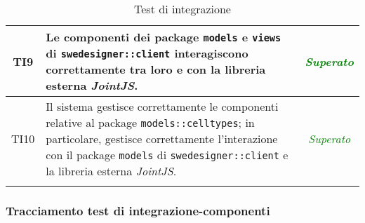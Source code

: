 \begin{longtable}{|c|>{}m{8cm}|c|}
\hypertarget{TI9}{TI9} & Le componenti dei package \texttt{models} e \texttt{views} di \texttt{swedesigner::client} interagiscono correttamente tra loro e con la libreria esterna \emph{JointJS}. & \textcolor{Green}{\textit{Superato}}\\ \hline
\hypertarget{TI10}{TI10} & Il sistema gestisce correttamente le componenti relative al package \texttt{models::celltypes}; in particolare, gestisce correttamente l'interazione con il package \texttt{models} di \texttt{swedesigner::client} e la libreria esterna \emph{JointJS}. & \textcolor{Green}{\textit{Superato}}\\ \hline
\caption[Test di integrazione]{Test di integrazione}
\label{tab:integr}
\end{longtable}
\clearpage

\subsubsection{Tracciamento test di integrazione-componenti}
\normalsize
